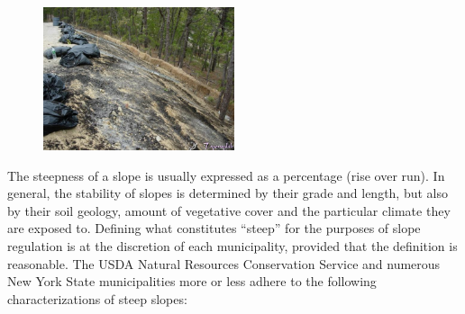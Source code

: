 \begin{figure}
    \hspace{-2mm}
        \includegraphics[width=0.5\textwidth]{images/compost222.jpg}
    \hspace{-2mm}
\end{figure}
The steepness of a slope is usually expressed as a percentage (rise over run). 
In general, the stability of slopes is determined by their grade and length, 
but also by their soil geology, amount of vegetative cover and the particular 
climate they are exposed to. Defining what constitutes “steep” for the purposes 
of slope regulation is at the discretion of each municipality, provided that the 
definition is reasonable. The USDA Natural Resources Conservation Service and 
numerous New York State municipalities more or less adhere to the following 
characterizations of steep slopes:

